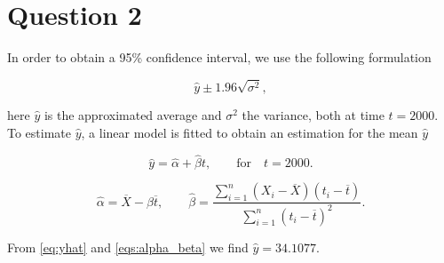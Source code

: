 \documentclass[a4paper]{article}
\begin{document}
\section*{Question 2}
In order to obtain a 95\% confidence interval, we use the following formulation

\begin{equation}
\hat{y} \pm 1.96 \sqrt{\sigma^2},
\end{equation}

here $\hat{y}$ is the approximated average and $\sigma^2$ the variance, both at time $t=2000$. To estimate $\hat{y}$, a linear model is fitted to obtain an estimation for the mean $\hat{y}$

\begin{equation}    \label{eq:yhat}
\hat{y}= \hat{\alpha}+\hat{\beta}t, \qquad \textrm{for} \quad t=2000.
\end{equation}

\begin{equation}    \label{eqs:alpha_beta}
\hat{\alpha} = \overline{X}- \hat{\beta} \overline{t}, \qquad
\hat{\beta} = \frac{\sum_{i=1}^{n}(X_i-\overline{X})(t_i-\overline{t})}{\sum_{i=1}^{n}(t_i-\overline{t})^2}.
\end{equation}   

From \eqref{eq:yhat} and \eqref{eqs:alpha_beta} we find $\hat{y}=34.1077$.
\end{document}
